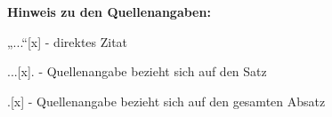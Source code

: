 \documentclass[
    fontsize=12pt,
    paper=a4,
    abstract=false,
    numbers=noenddot,
    listof=totoc,
    bibliography=totoc,
    parskip=half+
]{scrreprt}
\begin{document}
    
    
    
    
    
    
    
    \appendix
    \pagestyle{scrplain}
    \listoffigures
    \listoftables
    \renewcommand*{\lstlistlistingname}{Listingsverzeichnis}
    \lstlistoflistings
    \flushbottom
    
    
    \textbf{Hinweis zu den Quellenangaben:} \par
    „...“[x] - direktes Zitat \par
    ...[x].  - Quellenangabe bezieht sich auf den Satz \par
    .[x]     - Quellenangabe bezieht sich auf den gesamten Absatz
    
\end{document}
